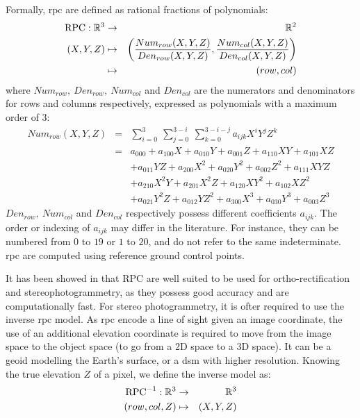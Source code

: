 Formally, \acrshort{rpc} are defined as rational fractions of polynomials:  
\begin{eqnarray}
    {\mathrm{RPC}}:\mathbb{R}^3 &\rightarrow&\mathbb{R}^2\nonumber\\
    (X,Y,Z) 	&\mapsto& \left(\frac{Num_{row}(X,Y,Z)}{Den_{row}(X,Y,Z)}, \frac{Num_{col}(X,Y,Z)}{Den_{col}(X,Y,Z)}\right)\nonumber\\
    &\mapsto&(row,col)\label{eq:rpc}
\end{eqnarray}
where $Num_{row},~Den_{row},~Num_{col}$ and $Den_{col}$ are the numerators and denominators for rows and columns respectively, expressed as polynomials with a maximum order of $3$:
\begin{eqnarray*}
    Num_{row}(X,Y,Z) &=& \sum_{i=0}^3~\sum_{j=0}^{3-i}~\sum_{k=0}^{3-i-j}a_{ijk}X^iY^jZ^k\\
    &=& a_{000} + a_{100} X + a_{010} Y + a_{001} Z + a_{110} XY + a_{101} XZ \\
    &&+ a_{011} YZ + a_{200} X^2 + a_{020} Y^2 + a_{002} Z^2 + a_{111} XYZ \\
    && + a_{210} X^2Y + a_{201} X^2Z + a_{120} XY^2 + a_{102} XZ^2\\
    && + a_{021} Y^2Z + a_{012} YZ^2 + a_{300} X^3 + a_{030} Y^3 + a_{003} Z^3
\end{eqnarray*}
$Den_{row},~Num_{col}$ and $Den_{col}$ respectively possess different coefficients $a_{ijk}$. The order or indexing of $a_{ijk}$ may differ in the literature. For instance, they can be numbered from $0$ to $19$ or $1$ to $20$, and do not refer to the same indeterminate. \acrshort{rpc} are computed using reference ground control points.

It has been showed in \cite{baltsavias_metric_1992} that RPC are well suited to be used for ortho-rectification and stereophotogrammetry, as they possess good accuracy and are computationally fast. For stereo photogrammetry, it is ofter required to use the inverse \acrshort{rpc} model. As \acrshort{rpc} encode a line of sight given an image coordinate, the use of an additional elevation coordinate is required to move from the image space to the object space (\ie to go from a 2D space to a 3D space). It can be a geoid modelling the Earth's surface, or a \acrshort{dsm} with higher resolution. Knowing the true elevation $Z$ of a pixel, we define the inverse model as:
\begin{eqnarray}
    {\mathrm{RPC}}^{-1}:\mathbb{R}^3 &\rightarrow&\mathbb{R}^3\nonumber\\
    (row, col, Z) 	&\mapsto& (X,Y,Z) \label{eq:inverse_rpc}
\end{eqnarray}

